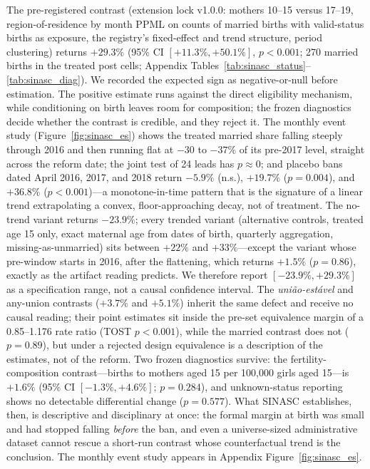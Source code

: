 \documentclass[12pt]{article}
\begin{document}
The pre-registered contrast (extension lock v1.0.0: mothers 10--15 versus 17--19,
region-of-residence by month PPML on counts of married births with valid-status births
as exposure, the registry's fixed-effect and trend structure, period clustering) returns
$+29.3\%$ (95\% CI $[+11.3\%, +50.1\%]$, $p<0.001$; 270 married births in the treated
post cells; Appendix Tables~\ref{tab:sinasc_status}--\ref{tab:sinasc_diag}). We
recorded the expected sign as negative-or-null before estimation. The positive estimate
runs against the direct eligibility mechanism, while conditioning on birth leaves room
for composition; the frozen diagnostics decide whether the contrast is credible, and
they reject it.
The monthly event study (Figure~\ref{fig:sinasc_es}) shows the treated married share
falling steeply through 2016 and then running flat at $-30$ to $-37\%$ of its pre-2017
level, straight across the reform date; the joint test of 24 leads has $p\approx 0$;
and placebo bans dated April 2016, 2017, and 2018 return $-5.9\%$ (n.s.), $+19.7\%$
($p=0.004$), and $+36.8\%$ ($p<0.001$)---a monotone-in-time pattern that is the
signature of a linear trend extrapolating a convex, floor-approaching decay, not of
treatment. The no-trend variant returns $-23.9\%$; every trended variant (alternative
controls, treated age 15 only, exact maternal age from dates of birth, quarterly
aggregation, missing-as-unmarried) sits between $+22\%$ and $+33\%$---except the
variant whose pre-window starts in 2016, after the flattening, which returns $+1.5\%$
($p=0.86$), exactly as the artifact reading predicts. We therefore report
$[-23.9\%, +29.3\%]$ as a specification range, not a causal confidence interval. The
\emph{uni\~ao-est\'avel} and any-union contrasts
($+3.7\%$ and $+5.1\%$) inherit the same defect and receive no causal reading; their
point estimates sit inside the pre-set equivalence margin of a 0.85--1.176 rate ratio
(TOST $p<0.001$), while the married contrast does not ($p=0.89$), but under a rejected
design equivalence is a description of the estimates, not of the reform. Two
frozen diagnostics survive: the fertility-composition contrast---births to mothers aged
15 per 100,000 girls aged 15---is $+1.6\%$ (95\% CI $[-1.3\%, +4.6\%]$;
$p=0.284$), and unknown-status reporting shows no detectable differential change
($p=0.577$). What SINASC establishes, then, is descriptive and disciplinary at once:
the formal margin at birth was small and
had stopped falling \emph{before} the ban, and even a universe-sized administrative
dataset cannot rescue a short-run contrast whose counterfactual trend is the
conclusion.
The monthly event study appears in Appendix Figure~\ref{fig:sinasc_es}.
\end{document}
